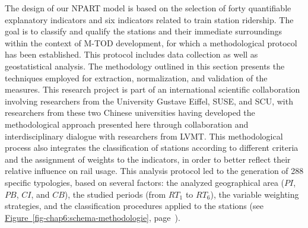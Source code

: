 \begin{refsegment}
The design of our \acrshort{NPART} model is based on the selection of forty quantifiable explanatory indicators and six indicators related to train station ridership. The goal is to classify and qualify the stations and their immediate surroundings within the context of \acrshort{M-TOD} development, for which a methodological protocol has been established. This protocol includes data collection as well as geostatistical analysis. The methodology outlined in this section presents the techniques employed for extraction, normalization, and validation of the measures. This research project is part of an international scientific collaboration involving researchers from the University Gustave Eiffel, \acrfull{SUSE}, and \acrfull{SCU}, with researchers from these two Chinese universities having developed the methodological approach presented here through collaboration and interdisciplinary dialogue with researchers from \acrfull{LVMT}. This methodological process also integrates the classification of stations according to different criteria and the assignment of weights to the indicators, in order to better reflect their relative influence on rail usage. This analysis protocol led to the generation of 288 specific typologies, based on several factors: the analyzed geographical area (\(PI\), \(PB\), \(CI\), and \(CB\)), the studied periods (from \(RT_{1}\) to \(RT_{6}\)), the variable weighting strategies, and the classification procedures applied to the stations (see \hyperref[fig-chap6:schema-methodologie]{Figure~\ref{fig-chap6:schema-methodologie}}, page~\pageref{fig-chap6:schema-methodologie}).


\end{refsegment}
